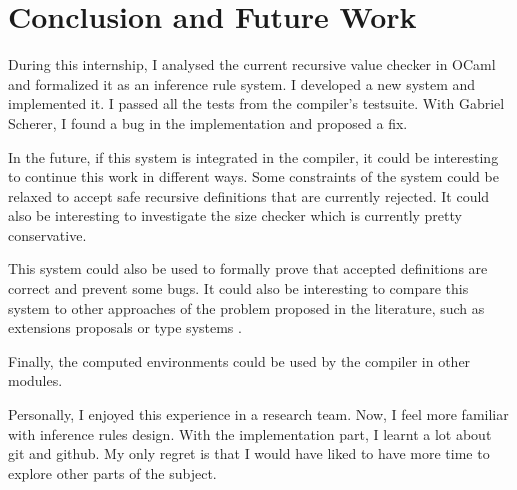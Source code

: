 \documentclass{article}
\begin{document}
\section*{Conclusion and Future Work}
During this internship, I analysed the current recursive value checker in OCaml
and formalized it as an inference rule system. I developed a new system and
implemented it. I passed all the tests from the compiler's testsuite. With
Gabriel Scherer, I found a bug in the implementation and proposed a fix.

In the future, if this system is integrated in the compiler, it could be
interesting to continue this work in different ways. Some constraints of the
system could be relaxed to accept safe recursive definitions that are currently
rejected. It could also be interesting to investigate the size checker which is
currently pretty conservative.

This system could also be used to formally prove that accepted definitions are
correct and prevent some bugs. It could also be interesting to compare this
system to other approaches of the problem proposed in the literature, such as
extensions proposals \cite{jeannin2012cocaml} or type systems
\cite{dreyer2004type}.

Finally, the computed environments could be used by the compiler in other
modules.

Personally, I enjoyed this experience in a research team. Now, I feel more
familiar with inference rules design. With the implementation part, I learnt a
lot about git and github. My only regret is that I would have liked to have
more time to explore other parts of the subject.



\end{document}
